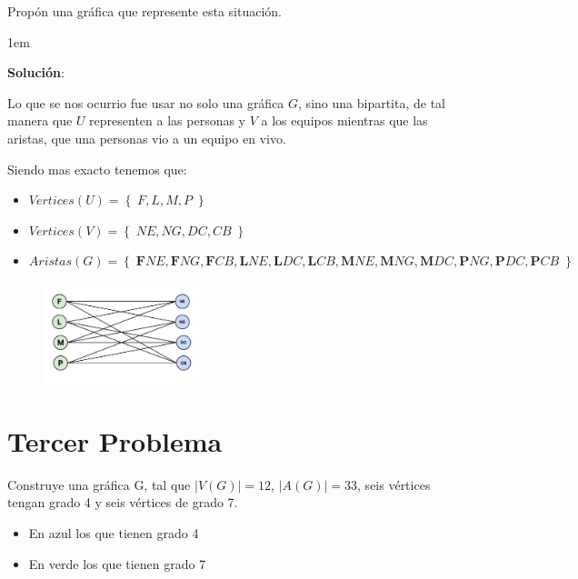 \documentclass[journal,12pt,onecolumn]{IEEEtran}                %
\newenvironment{SmallIndentation}[1][0.75em]                    %
        {\begin{adjustwidth}{#1}{}\begin{footnotesize}}             %
        {\end{footnotesize}\end{adjustwidth}}                       %
\theoremstyle{break}                                            %
\newcommand{\Set}[1]            {\left\{ \; #1 \; \right\}}     %
\begin{document}
        Propón una gráfica que represente esta situación. \\

        \begin{SmallIndentation}[1em]
            \textbf{Solución}:

            Lo que se nos ocurrio fue usar no solo una gráfica $G$, sino una bipartita,
            de tal manera que $U$ representen a las personas y $V$ a los equipos
            mientras que las aristas, que una personas vio a un equipo en vivo.

            Siendo mas exacto tenemos que:
            \begin{itemize}
                \item $Vertices(U) = \Set{F, L, M, P}$
                \item $Vertices(V) = \Set{NE, NG, DC, CB}$
                \item $Aristas(G) = \Set{
                    \mathbf{F}NE, \mathbf{F}NG, \mathbf{F}CB,
                    \mathbf{L}NE, \mathbf{L}DC, \mathbf{L}CB, 
                    \mathbf{M}NE, \mathbf{M}NG, \mathbf{M}DC,
                    \mathbf{P}NG, \mathbf{P}DC, \mathbf{P}CB
                }$
            \end{itemize}

            \begin{figure}[h]
                \includegraphics[width=0.4\textwidth]{2}
            \end{figure}
        \end{SmallIndentation}
    
    \section*{Tercer Problema}
        Construye una gráfica G, tal que $|V(G)| = 12$, $|A(G)| = 33$, 
        seis vértices tengan grado 4 y seis vértices de grado 7.

        \begin{itemize}
            \item En azul los que tienen grado 4
            \item En verde los que tienen grado 7
        \end{itemize}
\end{document}
